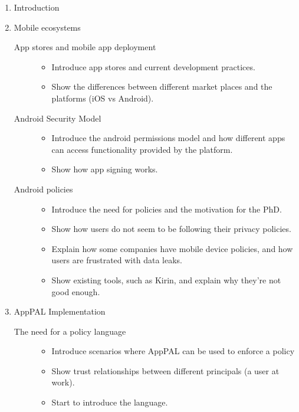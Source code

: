 \documentclass[a4paper]{scrartcl}
\begin{document}
\begin{enumerate}
  \item Introduction
  \item Mobile ecosystems
    \begin{description}
      \item[App stores and mobile app deployment]
        \hfill
        \begin{itemize}
          \item Introduce app stores and current development practices.
          \item Show the differences between different market places and the platforms (iOS vs Android).
        \end{itemize}
      \item[Android Security Model]
        \hfill
        \begin{itemize}
          \item Introduce the android permissions model and how different apps can access functionality provided by the platform.
          \item Show how app signing works.
        \end{itemize}
      \item[Android policies]
        \hfill
        \begin{itemize}
          \item Introduce the need for policies and the motivation for the PhD.
          \item Show how users do not seem to be following their privacy policies.
          \item Explain how some companies have mobile device policies, and how users are frustrated with data leaks.
          \item Show existing tools, such as Kirin, and explain why they're not good enough.
        \end{itemize}
    \end{description}
  \item AppPAL Implementation
    \begin{description}
      \item[The need for a policy language]
        \hfill
        \begin{itemize}
          \item Introduce scenarios where AppPAL can be used to enforce a policy
          \item Show trust relationships between different principals (a user at work).
          \item Start to introduce the language.

\end{itemize}
\end{description}
\end{enumerate}
\end{document}
